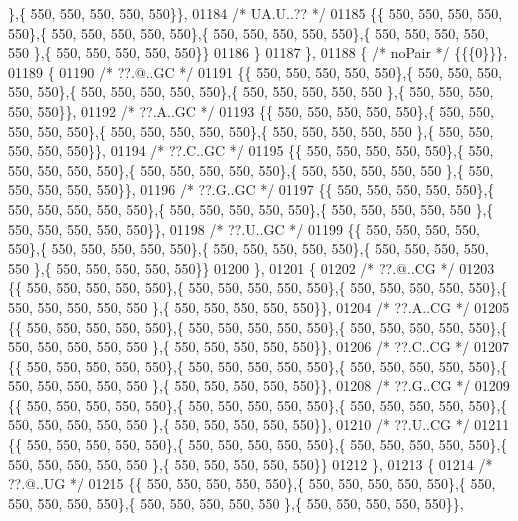 \begin{DoxyCode}
      \},\{ 550, 550, 550, 550, 550\}\},
01184 \textcolor{comment}{/* UA.U..?? */}
01185 \{\{ 550, 550, 550, 550, 550\},\{ 550, 550, 550, 550, 550\},\{ 550, 550, 550, 550, 550\},\{ 550, 550, 550, 550, 550
      \},\{ 550, 550, 550, 550, 550\}\}
01186 \}
01187 \},
01188 \{ \textcolor{comment}{/* noPair */} \{\{\{0\}\}\},
01189 \{
01190 \textcolor{comment}{/* ??.@..GC */}
01191 \{\{ 550, 550, 550, 550, 550\},\{ 550, 550, 550, 550, 550\},\{ 550, 550, 550, 550, 550\},\{ 550, 550, 550, 550, 550
      \},\{ 550, 550, 550, 550, 550\}\},
01192 \textcolor{comment}{/* ??.A..GC */}
01193 \{\{ 550, 550, 550, 550, 550\},\{ 550, 550, 550, 550, 550\},\{ 550, 550, 550, 550, 550\},\{ 550, 550, 550, 550, 550
      \},\{ 550, 550, 550, 550, 550\}\},
01194 \textcolor{comment}{/* ??.C..GC */}
01195 \{\{ 550, 550, 550, 550, 550\},\{ 550, 550, 550, 550, 550\},\{ 550, 550, 550, 550, 550\},\{ 550, 550, 550, 550, 550
      \},\{ 550, 550, 550, 550, 550\}\},
01196 \textcolor{comment}{/* ??.G..GC */}
01197 \{\{ 550, 550, 550, 550, 550\},\{ 550, 550, 550, 550, 550\},\{ 550, 550, 550, 550, 550\},\{ 550, 550, 550, 550, 550
      \},\{ 550, 550, 550, 550, 550\}\},
01198 \textcolor{comment}{/* ??.U..GC */}
01199 \{\{ 550, 550, 550, 550, 550\},\{ 550, 550, 550, 550, 550\},\{ 550, 550, 550, 550, 550\},\{ 550, 550, 550, 550, 550
      \},\{ 550, 550, 550, 550, 550\}\}
01200 \},
01201 \{
01202 \textcolor{comment}{/* ??.@..CG */}
01203 \{\{ 550, 550, 550, 550, 550\},\{ 550, 550, 550, 550, 550\},\{ 550, 550, 550, 550, 550\},\{ 550, 550, 550, 550, 550
      \},\{ 550, 550, 550, 550, 550\}\},
01204 \textcolor{comment}{/* ??.A..CG */}
01205 \{\{ 550, 550, 550, 550, 550\},\{ 550, 550, 550, 550, 550\},\{ 550, 550, 550, 550, 550\},\{ 550, 550, 550, 550, 550
      \},\{ 550, 550, 550, 550, 550\}\},
01206 \textcolor{comment}{/* ??.C..CG */}
01207 \{\{ 550, 550, 550, 550, 550\},\{ 550, 550, 550, 550, 550\},\{ 550, 550, 550, 550, 550\},\{ 550, 550, 550, 550, 550
      \},\{ 550, 550, 550, 550, 550\}\},
01208 \textcolor{comment}{/* ??.G..CG */}
01209 \{\{ 550, 550, 550, 550, 550\},\{ 550, 550, 550, 550, 550\},\{ 550, 550, 550, 550, 550\},\{ 550, 550, 550, 550, 550
      \},\{ 550, 550, 550, 550, 550\}\},
01210 \textcolor{comment}{/* ??.U..CG */}
01211 \{\{ 550, 550, 550, 550, 550\},\{ 550, 550, 550, 550, 550\},\{ 550, 550, 550, 550, 550\},\{ 550, 550, 550, 550, 550
      \},\{ 550, 550, 550, 550, 550\}\}
01212 \},
01213 \{
01214 \textcolor{comment}{/* ??.@..UG */}
01215 \{\{ 550, 550, 550, 550, 550\},\{ 550, 550, 550, 550, 550\},\{ 550, 550, 550, 550, 550\},\{ 550, 550, 550, 550, 550
      \},\{ 550, 550, 550, 550, 550\}\},

\end{DoxyCode}

